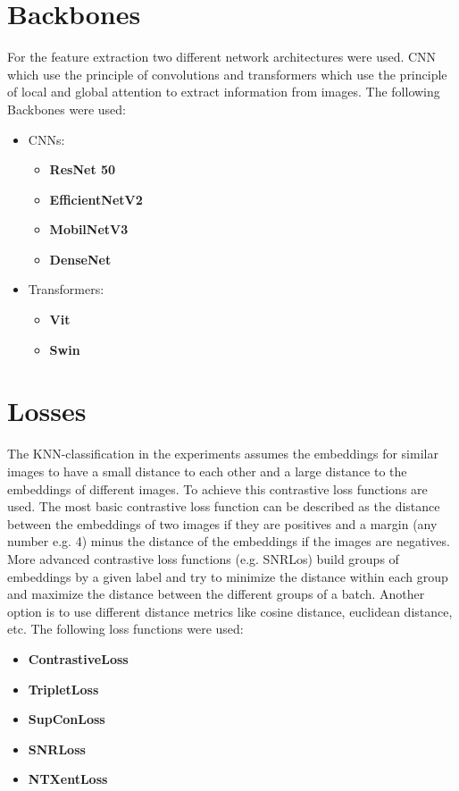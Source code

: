 \documentclass[12pt,a4paper]{report}
\begin{document}
\section{Backbones}
For the feature extraction two different network architectures were used.
CNN which use the principle of convolutions and transformers which use the principle of local and global attention to extract information from images. 
The following Backbones were used:
\begin{itemize}
	\item CNNs:\begin{itemize}
		\item \textbf{ResNet 50} \cite{resnet}
		\item \textbf{EfficientNetV2} \cite{EfficientNetV2}
		\item \textbf{MobilNetV3} \cite{MobilNetV3}
		\item \textbf{DenseNet} \cite{DenseNet}
	\end{itemize}
	\item Transformers:\begin{itemize}
		\item \textbf{Vit} \cite{ViT}
		\item \textbf{Swin} \cite{liu2021swin}
    \end{itemize}
\end{itemize}

\section{Losses}
The KNN-classification in the experiments assumes the embeddings for similar images to have a small distance to each other
and a large distance to the embeddings of different images.
To achieve this contrastive loss functions are used.
The most basic contrastive loss function can be described as the distance between the embeddings of two images if they are positives and a margin (any number e.g. 4) minus the distance of the embeddings if the images are negatives.
More advanced contrastive loss functions (e.g. SNRLos) build groups of embeddings by a given label and try to minimize the distance within each group and maximize the distance between the different groups of a batch.
Another option is to use different distance metrics like cosine distance, euclidean distance, etc.
The following loss functions were used:
\begin{itemize}
	\item \textbf{ContrastiveLoss} \cite{ContrastiveLoss}
 	\item \textbf{TripletLoss} \cite{TripletLoss}
  	\item \textbf{SupConLoss} \cite{SupConLoss}
    \item \textbf{SNRLoss} \cite{SNRLoss}
    \item \textbf{NTXentLoss} \cite{simclr}
\end{itemize}
\end{document}
